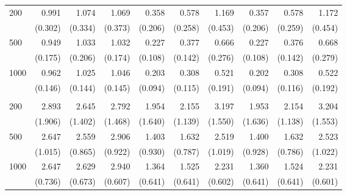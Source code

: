 \begin{table}[H]
{\begin{tabular}{lrrrrrrrrr}
\midrule
200 & 0.991 & 1.074 & 1.069 & 0.358 & 0.578 & 1.169 & 0.357 & 0.578 & 1.172 \\
  & (0.302) & (0.334) & (0.373) & (0.206) & (0.258) & (0.453) & (0.206) & (0.259) & (0.454) \\
500 & 0.949 & 1.033 & 1.032 & 0.227 & 0.377 & 0.666 & 0.227 & 0.376 & 0.668 \\
  & (0.175) & (0.206) & (0.174) & (0.108) & (0.142) & (0.276) & (0.108) & (0.142) & (0.279) \\
1000 & 0.962 & 1.025 & 1.046 & 0.203 & 0.308 & 0.521 & 0.202 & 0.308 & 0.522 \\
  & (0.146) & (0.144) & (0.145) & (0.094) & (0.115) & (0.191) & (0.094) & (0.116) & (0.192) \\
\addlinespace
\midrule
\multicolumn{10}{l}{Non-linear interaction} \\
\midrule
200 & 2.893 & 2.645 & 2.792 & 1.954 & 2.155 & 3.197 & 1.953 & 2.154 & 3.204 \\
  & (1.906) & (1.402) & (1.468) & (1.640) & (1.139) & (1.550) & (1.636) & (1.138) & (1.553) \\
500 & 2.647 & 2.559 & 2.906 & 1.403 & 1.632 & 2.519 & 1.400 & 1.632 & 2.523 \\
  & (1.015) & (0.865) & (0.922) & (0.930) & (0.787) & (1.019) & (0.928) & (0.786) & (1.022) \\
1000 & 2.647 & 2.629 & 2.940 & 1.364 & 1.525 & 2.231 & 1.360 & 1.524 & 2.231 \\
  & (0.736) & (0.673) & (0.607) & (0.641) & (0.641) & (0.602) & (0.641) & (0.641) & (0.601) \\
\bottomrule
\end{tabular}%
}
\end{table}
